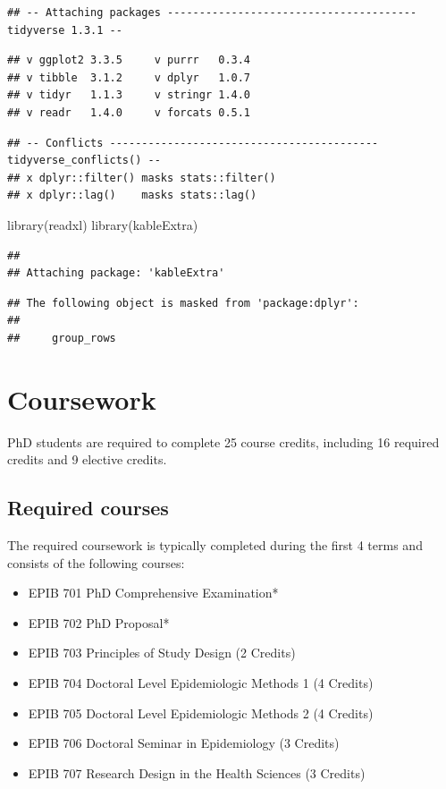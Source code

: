 \documentclass[
]{book}
\newenvironment{Shaded}{\begin{snugshade}}{\end{snugshade}}
\newcommand{\FunctionTok}[1]{\textcolor[rgb]{0.00,0.00,0.00}{#1}}
\newcommand{\NormalTok}[1]{#1}
\providecommand{\tightlist}{%
  \setlength{\itemsep}{0pt}\setlength{\parskip}{0pt}}
\begin{document}
\begin{verbatim}
## -- Attaching packages --------------------------------------- tidyverse 1.3.1 --
\end{verbatim}

\begin{verbatim}
## v ggplot2 3.3.5     v purrr   0.3.4
## v tibble  3.1.2     v dplyr   1.0.7
## v tidyr   1.1.3     v stringr 1.4.0
## v readr   1.4.0     v forcats 0.5.1
\end{verbatim}

\begin{verbatim}
## -- Conflicts ------------------------------------------ tidyverse_conflicts() --
## x dplyr::filter() masks stats::filter()
## x dplyr::lag()    masks stats::lag()
\end{verbatim}

\begin{Shaded}
\begin{Highlighting}[]
\FunctionTok{library}\NormalTok{(readxl)}
\FunctionTok{library}\NormalTok{(kableExtra)}
\end{Highlighting}
\end{Shaded}

\begin{verbatim}
## 
## Attaching package: 'kableExtra'
\end{verbatim}

\begin{verbatim}
## The following object is masked from 'package:dplyr':
## 
##     group_rows
\end{verbatim}

\hypertarget{coursework}{%
\chapter{Coursework}\label{coursework}}

PhD students are required to complete 25 course credits, including 16 required credits and 9 elective credits.

\hypertarget{required-courses}{%
\section{Required courses}\label{required-courses}}

The required coursework is typically completed during the first 4 terms and consists of the following courses:

\begin{itemize}
\tightlist
\item
  EPIB 701 PhD Comprehensive Examination*
\item
  EPIB 702 PhD Proposal*
\item
  EPIB 703 Principles of Study Design (2 Credits)
\item
  EPIB 704 Doctoral Level Epidemiologic Methods 1 (4 Credits)
\item
  EPIB 705 Doctoral Level Epidemiologic Methods 2 (4 Credits)
\item
  EPIB 706 Doctoral Seminar in Epidemiology (3 Credits)
\item
  EPIB 707 Research Design in the Health Sciences (3 Credits)
\end{itemize}
\end{document}
